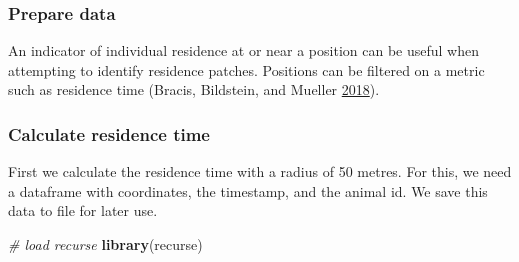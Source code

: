 \documentclass[
]{scrartcl}
\newenvironment{Shaded}{}{}
\newcommand{\CommentTok}[1]{\textcolor[rgb]{0.38,0.63,0.69}{\textit{#1}}}
\newcommand{\DataTypeTok}[1]{\textcolor[rgb]{0.56,0.13,0.00}{#1}}
\newcommand{\DecValTok}[1]{\textcolor[rgb]{0.25,0.63,0.44}{#1}}
\newcommand{\ErrorTok}[1]{\textcolor[rgb]{1.00,0.00,0.00}{\textbf{#1}}}
\newcommand{\KeywordTok}[1]{\textcolor[rgb]{0.00,0.44,0.13}{\textbf{#1}}}
\newcommand{\NormalTok}[1]{#1}
\newcommand{\OperatorTok}[1]{\textcolor[rgb]{0.40,0.40,0.40}{#1}}
\newcommand{\StringTok}[1]{\textcolor[rgb]{0.25,0.44,0.63}{#1}}
\begin{document}
\hypertarget{prepare-data}{%
\subsubsection{Prepare data}\label{prepare-data}}

An indicator of individual residence at or near a position can be useful when attempting to identify residence patches. Positions can be filtered on a metric such as residence time (Bracis, Bildstein, and Mueller \protect\hyperlink{ref-bracis2018}{2018}).

\hypertarget{calculate-residence-time}{%
\subsubsection{Calculate residence time}\label{calculate-residence-time}}

First we calculate the residence time with a radius of 50 metres.
For this, we need a dataframe with coordinates, the timestamp, and the animal id.
We save this data to file for later use.

\begin{Shaded}
\begin{Highlighting}[]
\CommentTok{\# load recurse}
\KeywordTok{library}\NormalTok{(recurse)}
\end{Highlighting}
\end{Shaded}

\begin{Shaded}
\end{Shaded}
\end{document}
